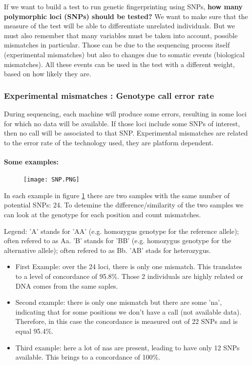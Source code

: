 If we want to build a test to run genetic fingerprinting using SNPs, \textbf{how many polymorphic loci (SNPs) should be tested?}
We want to make sure that the measure of the test will be able to differentiate unrelated individuals.
But we must also remember that many variables must be taken into account, possible mismatches in particular. Those can be due to the sequencing process itself (experimental mismatches) but also to changes due to somatic events (biological mismatches). All these events can be used in the test with a different weight, based on how likely they are.


\subsubsection{Experimental mismatches : Genotype call error rate}

During sequencing, each machine will produce some errors, resulting in some loci for which no data will be available. If those loci include some SNPs of interest, then no call will be associated to that SNP.
Experimental mismatches are related to the error rate of the technology used, they are platform dependent.

\paragraph*{Some examples:}

\begin{figure}[H]
	\texttt{[image: SNP.PNG]}
	\caption{\label{fig:SNP}}
\end{figure}

In each example in figure \ref{fig:SNP} there are two samples with the same number of potential SNPs: 24. To detemine the difference/similarity of the two samples we can look at the genotype for each position and count mismatches.

Legend:
'A' stands for 'AA' (e.g. homozygus genotype for the reference allele); often refered to as Aa.
'B' stands for 'BB' (e.g. homozygus genotype for the alternative allele); often refered to as Bb.
'AB' stads for heterozygus.

\begin{itemize}
	\item First Example: over the 24 loci, there is only one mismatch. This translates to a level of concordance of 95.8\%. Those 2 individuals are highly related or DNA comes from the same saples.
	\item Second example: there is only one mismatch but there are some 'na', indicating that for some positions we don't have a call (not available data). Therefore, in this case the concordance is measured out of 22 SNPs and is equal 95.4\%.
	\item Third example: here a lot of nas are present, leading to have only 12 SNPs available. This brings to a concordance of 100\%.
\end{itemize}

